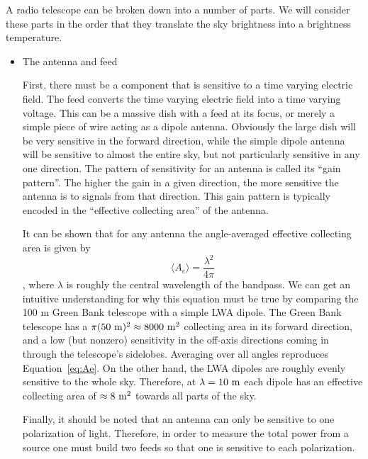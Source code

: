 \begin{enumerate}
      A radio telescope can be broken down into a number of parts.  We will consider these
      parts in the order that they translate the sky brightness into a brightness temperature.
      \begin{itemize}
      \item The antenna and feed

            First, there must be a component that is sensitive to a time varying electric
            field.  The feed converts the time varying electric field into a time varying voltage.
            This can be a massive dish with a feed at its focus, or merely a
            simple piece of wire acting as a dipole antenna.  Obviously the large dish will
            be very sensitive in the forward direction, while the simple dipole antenna will
            be sensitive to almost the entire sky, but not particularly sensitive in any one
            direction.  The pattern of sensitivity for an antenna is called its ``gain pattern''.
            The higher the gain in a given direction, the more sensitive the antenna is to signals
            from that direction.  This gain pattern is typically encoded in the ``effective
            collecting area'' of the antenna.

            It can be shown that for any antenna the angle-averaged effective collecting area
            is given by
            \begin{dmath}\label{eq:Ae}
                \langle A_e\rangle = \frac{\lambda^2}{4\pi}
            \end{dmath},
            where $\lambda$ is roughly the central wavelength of the bandpass.  We can get
            an intuitive understanding for why this equation must be true by comparing the
            100 m Green Bank telescope with a simple LWA dipole.  The Green Bank telescope
            has a $\pi(50~{\rm m})^2 \approx 8000~{\rm m}^2$ collecting area in its forward
            direction, and a low (but nonzero) sensitivity in the off-axis directions coming
            in through the telescope's sidelobes.  Averaging over all angles reproduces
            Equation~\ref{eq:Ae}.  On the other hand, the LWA dipoles are roughly evenly
            sensitive to the whole sky.  Therefore, at $\lambda=10~{\rm m}$ each dipole has
            an effective collecting area of $\approx 8~{\rm m}^2$ towards all parts of the sky.

            Finally, it should be noted that an antenna can only be sensitive to one polarization
            of light.  Therefore, in order to measure the total power from a source one must
            build two feeds so that one is sensitive to each polarization.


\end{itemize}
\end{enumerate}
